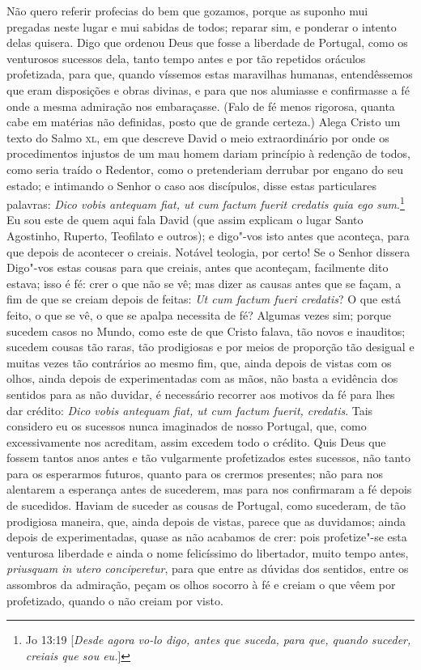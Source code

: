 Não quero referir profecias do bem que gozamos, porque as suponho mui
pregadas neste lugar e mui sabidas de todos; reparar sim, e ponderar o
intento delas quisera. Digo que ordenou Deus que fosse a liberdade de
Portugal, como os venturosos sucessos dela, tanto tempo antes e por tão
repetidos oráculos profetizada, para que, quando víssemos estas
maravilhas humanas, entendêssemos que eram disposições e obras divinas,
e para que nos alumiasse e confirmasse a fé onde a mesma admiração nos
embaraçasse. (Falo de fé menos rigorosa, quanta cabe em matérias não
definidas, posto que de grande certeza.) Alega Cristo um texto do Salmo
\textsc{xl}, em que descreve David o meio extraordinário por onde os
procedimentos injustos de um mau homem dariam princípio à redenção de
todos, como seria traído o Redentor, como o pretenderiam derrubar por
engano do seu estado; e intimando o Senhor o caso aos discípulos, disse
estas particulares palavras: \emph{Dico vobis antequam fiat, ut cum
factum fuerit credatis quia ego sum}.\footnote{Jo 13:19 [\textit{Desde agora vo-lo digo, antes que suceda, para que, quando suceder, creiais que sou eu.}]} Eu sou este de quem aqui fala David (que assim explicam o lugar Santo Agostinho, Ruperto, Teofilato e outros); e digo"-vos isto antes que aconteça, para que depois de acontecer o creiais.
Notável teologia, por certo! Se o Senhor dissera Digo"-vos estas cousas
para que creiais, antes que aconteçam, facilmente dito estava; isso é fé:
crer o que não se vê; mas dizer as causas antes que se façam, a fim
de que se creiam depois de feitas: \emph{Ut cum factum fueri credatis}?
O que está feito, o que se vê, o que se apalpa necessita de fé?
Algumas vezes sim; porque sucedem casos no Mundo, como este de que
Cristo falava, tão novos e inauditos; sucedem cousas tão raras, tão
prodigiosas e por meios de proporção tão desigual e muitas vezes tão
contrários ao mesmo fim, que, ainda depois de vistas com os olhos, ainda
depois de experimentadas com as mãos, não basta a evidência dos sentidos
para as não duvidar, é necessário recorrer aos motivos da fé para lhes
dar crédito: \emph{Dico vobis antequam fiat, ut cum factum fuerit,
credatis}. Tais considero eu os sucessos nunca imaginados de nosso
Portugal, que, como excessivamente nos acreditam, assim excedem todo o
crédito.
Quis Deus que fossem tantos anos antes e tão vulgarmente profetizados
estes sucessos, não tanto para os esperarmos futuros, quanto para os
crermos presentes; não para nos alentarem a esperança antes de
sucederem, mas para nos confirmaram a fé depois de sucedidos. Haviam de
suceder as cousas de Portugal, como sucederam, de tão prodigiosa
maneira, que, ainda depois de vistas, parece que as duvidamos; ainda
depois de experimentadas, quase as não acabamos de crer: pois
profetize"-se esta venturosa liberdade e ainda o nome felicíssimo do
libertador, muito tempo antes, \emph{priusquam in utero conciperetur},
para que entre as dúvidas dos sentidos, entre os assombros da
admiração, peçam os olhos socorro à fé e creiam o que vêem por
profetizado, quando o não creiam por visto.

